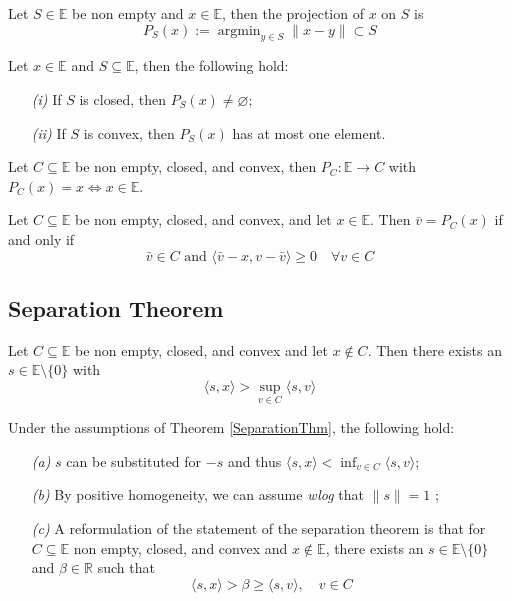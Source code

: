 \documentclass{tufte-handout}
\DeclareMathOperator{\argmin}{argmin}
\begin{document}
{  
\begin{definition}
Let $S \in \mathbb{E}$ be non empty and $x \in \mathbb{E}$, then the projection of $x$ on $S$ is 
  $$P_S(x) := \argmin_{y \in S} \|x-y\| \subset S $$
\end{definition}
\begin{lemma} 
  Let $x \in \mathbb{E}$ and $S\subseteq \mathbb{E}$, then the following hold: 
  \begin{enumerate}
    \item[\it (i)] If $S$ is closed, then $P_S(x)\neq \varnothing;$ 
    \item[\it (ii)] If $S$ is convex, then $P_S(x)$ has at most one element. 
  \end{enumerate}
\end{lemma}
\begin{corollary}
  Let $C \subseteq \mathbb{E}$ be non empty, closed, and convex, then $P_C : \mathbb{E} \to C$ with $P_C(x) = x \iff x \in \mathbb{E} $. 
\end{corollary}
 \begin{theorem} \label{label}
   Let $C \subseteq \mathbb{E}$ be non empty, closed, and convex, and let $x \in \mathbb{E}$. Then $\bar v = P_C(x)$ if and only if
   $$\bar v \in C \text{ and } \langle\bar v - x , v - \bar v \rangle \geq 0 \quad \forall v \in C $$
 \end{theorem}
 \subsection{Separation Theorem}
 \begin{theorem} \label{SeparationThm}
   Let $C \subseteq \mathbb{E}$ be non empty, closed, and convex and let $x \notin C$. Then there exists an $s \in \mathbb{E} \setminus \{ 0 \}$ with
   $$\langle s , x\rangle > \sup_{v\in C}\langle s, v \rangle  $$ 
 \end{theorem}
 \begin{remark} 
   Under the assumptions of Theorem \ref{SeparationThm}, the following hold: 
   \begin{enumerate}
     \item[\it (a)] $s$ can be substituted for $-s$ and thus $\langle s , x\rangle <\inf_{v\in C}\langle s, v \rangle $;
     \item[\it (b)] By positive homogeneity, we can assume \textit{wlog} that $\| s\| =1$ ;
     \item[\it (c)] A reformulation of the statement of the separation theorem is that for $C \subseteq \mathbb{E}$ non empty, closed, and convex and $x \notin \mathbb{E}$, there exists an $s \in \mathbb{E}\setminus \{0\}$ and $\beta \in \mathbb{R}$ such that
     $$\langle s, x \rangle > \beta \geq \langle s, v \rangle, \quad v \in C $$


\end{enumerate}
\end{remark}}
\end{document}
